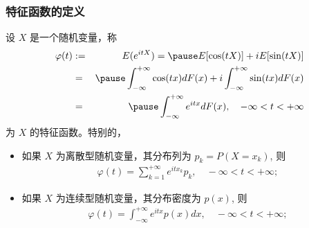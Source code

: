 \begin{frame}
	\frametitle{特征函数的定义}
	\begin{defi}
		设 $X$ 是一个随机变量，称
		\begin{eqnarray*}
			\varphi(t)&:=&E(e^{itX})=\pause E[\cos(tX)]+iE[\sin(tX)]\\
			&=&\pause \int_{-\infty}^{+\infty}\cos(tx)dF(x)+i\int_{-\infty}^{+\infty}\sin(tx)dF(x)\\
			&=&\pause \int_{-\infty}^{+\infty}e^{itx}dF(x), \quad -\infty <t<+\infty
		\end{eqnarray*}
		\pause 为 $X$ 的特征函数。特别的，
		\begin{itemize}[<+-|alert@+>]
			\item
			如果 $X$ 为离散型随机变量，其分布列为 $p_k=P (X=x_k)$, 则
			\begin{eqnarray*}
				\varphi(t)=\sum_{k=1}^{+\infty}e^{itx_k}p_k, \quad -\infty <t<+\infty;
			\end{eqnarray*}
			\item  如果 $X$ 为连续型随机变量，其分布密度为 $p (x)$, 则
			\begin{eqnarray*}
				\varphi(t)=\int_{-\infty}^{+\infty}e^{itx}p(x)dx, \quad -\infty <t<+\infty;
			\end{eqnarray*}
		\end{itemize}

	\end{defi}
\end{frame}


